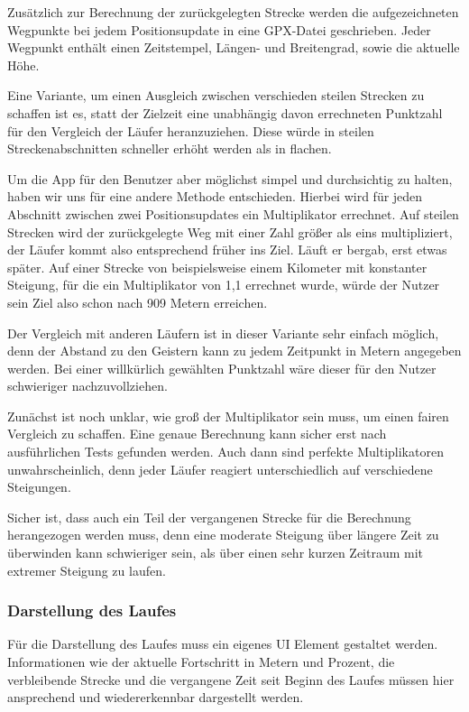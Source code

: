 Zusätzlich zur Berechnung der zurückgelegten Strecke werden die aufgezeichneten Wegpunkte bei jedem Positionsupdate in eine GPX-Datei geschrieben. Jeder Wegpunkt enthält einen Zeitstempel, Längen- und Breitengrad, sowie die aktuelle Höhe.

Eine Variante, um einen Ausgleich zwischen verschieden steilen Strecken zu schaffen ist es, statt der Zielzeit eine unabhängig davon errechneten Punktzahl für den Vergleich der Läufer heranzuziehen. Diese würde in steilen Streckenabschnitten schneller erhöht werden als in flachen.

Um die App für den Benutzer aber möglichst simpel und durchsichtig zu halten, haben wir uns für eine andere Methode entschieden. Hierbei wird für jeden Abschnitt zwischen zwei Positionsupdates ein Multiplikator errechnet. Auf steilen Strecken wird der zurückgelegte Weg mit einer Zahl größer als eins multipliziert, der Läufer kommt also entsprechend früher ins Ziel. Läuft er bergab, erst etwas später. Auf einer Strecke von beispielsweise einem Kilometer mit konstanter Steigung, für die ein Multiplikator von 1,1 errechnet wurde, würde der Nutzer sein Ziel also schon nach 909 Metern erreichen.

Der Vergleich mit anderen Läufern ist in dieser Variante sehr einfach möglich, denn der Abstand zu den Geistern kann zu jedem Zeitpunkt in Metern angegeben werden. Bei einer willkürlich gewählten Punktzahl wäre dieser für den Nutzer schwieriger nachzuvollziehen.

Zunächst ist noch unklar, wie groß der Multiplikator sein muss, um einen fairen Vergleich zu schaffen. Eine genaue Berechnung kann sicher erst nach ausführlichen Tests gefunden werden. Auch dann sind perfekte Multiplikatoren unwahrscheinlich, denn jeder Läufer reagiert unterschiedlich auf verschiedene Steigungen.

Sicher ist, dass auch ein Teil der vergangenen Strecke für die Berechnung herangezogen werden muss, denn eine moderate Steigung über längere Zeit zu überwinden kann schwieriger sein, als über einen sehr kurzen Zeitraum mit extremer Steigung zu laufen.
\subsubsection{Darstellung des Laufes}
Für die Darstellung des Laufes muss ein eigenes UI Element gestaltet werden. Informationen wie der aktuelle Fortschritt in Metern und Prozent, die verbleibende Strecke und die vergangene Zeit seit Beginn des Laufes müssen hier ansprechend und wiedererkennbar dargestellt werden.

